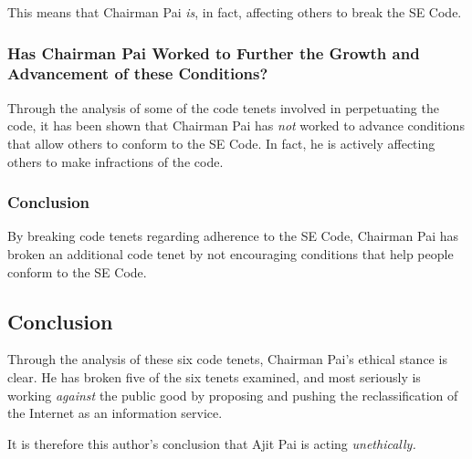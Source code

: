 \documentclass[12pt]{article}
\begin{document}
\begin{multicols}{2}
  This means that Chairman Pai \textit{is}, in fact, affecting others to break the SE Code.
  
  \subsubsection{Has Chairman Pai Worked to Further the Growth and Advancement of these Conditions?}
  Through the analysis of some of the code tenets involved in perpetuating the code, it has been shown that Chairman Pai has \textit{not} worked to advance conditions that allow others to conform to the SE Code. In fact, he is actively affecting others to make infractions of the code.
  
  \subsubsection{Conclusion}
  By breaking code tenets regarding adherence to the SE Code, Chairman Pai has broken an additional code tenet by not encouraging conditions that help people conform to the SE Code.
  
  \subsection{Conclusion}
  Through the analysis of these six code tenets, Chairman Pai's ethical stance is clear. He has broken five of the six tenets examined, and most seriously is working \textit{against} the public good by proposing and pushing the reclassification of the Internet as an information service.
  
  It is therefore this author's conclusion that Ajit Pai is acting \textit{unethically.}
  
  


\end{multicols}

\newpage
\nocite{*}



\end{document}
